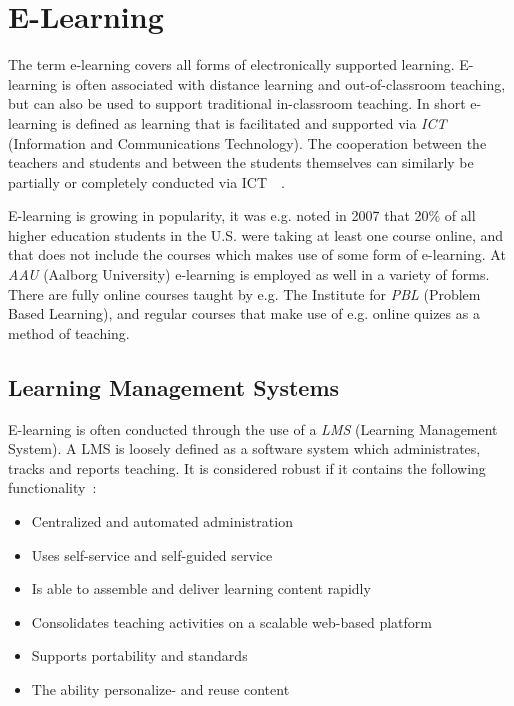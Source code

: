 \section{E-Learning}\label{sec:e-learning}
The term e-learning covers all forms of electronically supported learning. E-learning is often associated with distance learning and out-of-classroom teaching, but can also be used to support traditional in-classroom teaching. In short e-learning is defined as learning that is facilitated and supported via \emph{ICT} (Information and Communications Technology). The cooperation between the teachers and students and between the students themselves can similarly be partially or completely conducted via ICT~\citep{def_e-learning1}~\citep{def_e-learning2}.

E-learning is growing in popularity, it was e.g. noted in 2007 that 20\% of all higher education students in the U.S. were taking at least one course online, and that does not include the courses which makes use of some form of e-learning.	At \emph{AAU} (Aalborg University) e-learning is employed as well in a variety of forms. There are fully online courses taught by e.g. The Institute for \emph{PBL} (Problem Based Learning)\cite{mpbl}, and regular courses that make use of e.g. online quizes as a method of teaching. 

\subsection{Learning Management Systems}
E-learning is often conducted through the use of a \emph{LMS} (Learning Management System). A LMS is loosely defined as a software system which administrates, tracks and reports teaching. It is considered robust if it contains the following functionality~\citep{Ellis09}:

\begin{itemize}
	\item Centralized and automated administration
	\item Uses self-service and self-guided service
	\item Is able to assemble and deliver learning content rapidly
	\item Consolidates teaching activities on a scalable web-based platform
	\item Supports portability and standards
	\item The ability personalize- and reuse content
\end{itemize}

